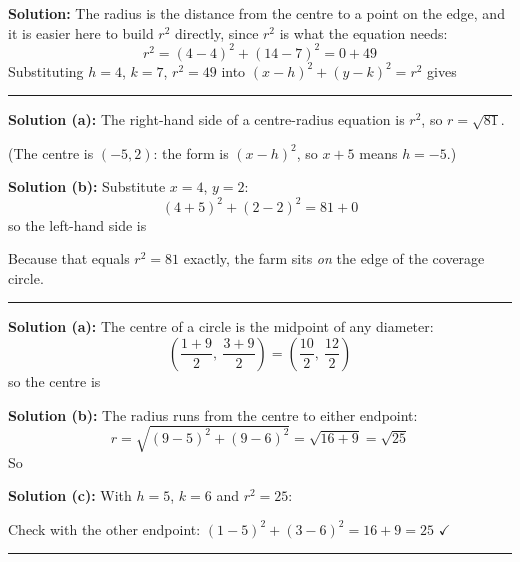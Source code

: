 \documentclass[12pt]{article}
\begin{document}




\textbf{Solution:} The radius is the distance from the centre to a point on the edge, and it is easier here to build $r^2$ directly, since $r^2$ is what the equation needs:
\[ r^2 = (4-4)^2 + (14-7)^2 = 0 + 49 \]
Substituting $h = 4$, $k = 7$, $r^2 = 49$ into $(x-h)^2 + (y-k)^2 = r^2$ gives 

\vspace{0.2cm}\noindent\rule{\linewidth}{0.2pt}


\textbf{Solution (a):} The right-hand side of a centre-radius equation is $r^2$, so $r = \sqrt{81}$. 

(The centre is $(-5, 2)$: the form is $(x - h)^2$, so $x + 5$ means $h = -5$.)

\textbf{Solution (b):} Substitute $x = 4$, $y = 2$:
\[ (4 + 5)^2 + (2 - 2)^2 = 81 + 0 \]
so the left-hand side is 

Because that equals $r^2 = 81$ exactly, the farm sits \emph{on} the edge of the coverage circle.

\vspace{0.2cm}\noindent\rule{\linewidth}{0.2pt}


\textbf{Solution (a):} The centre of a circle is the midpoint of any diameter:
\[ \left( \frac{1 + 9}{2}, \ \frac{3 + 9}{2} \right) = \left( \frac{10}{2}, \ \frac{12}{2} \right) \]
so the centre is 

\textbf{Solution (b):} The radius runs from the centre to either endpoint:
\[ r = \sqrt{(9-5)^2 + (9-6)^2} = \sqrt{16 + 9} = \sqrt{25} \]
So 

\textbf{Solution (c):} With $h = 5$, $k = 6$ and $r^2 = 25$: 

Check with the other endpoint: $(1-5)^2 + (3-6)^2 = 16 + 9 = 25$ $\checkmark$

\vspace{0.2cm}\noindent\rule{\linewidth}{0.2pt}
\end{document}
